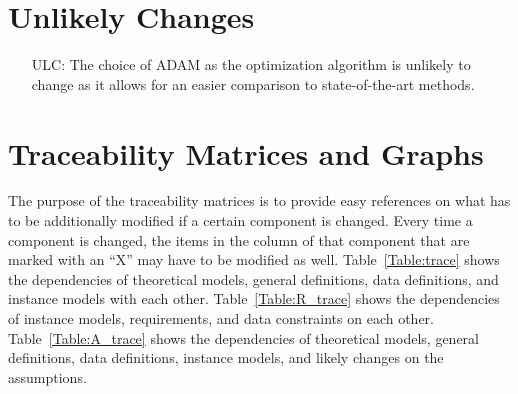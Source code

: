 \documentclass[12pt]{article}
\newcounter{lcnum} %
\newcounter{ulcnum} %
\begin{document}
\section{Unlikely Changes}    

\noindent \begin{itemize}

\item[ULC\refstepcounter{ulcnum}\theulcnum\label{ULC:meaningfulLabel}:] The choice of ADAM as the optimization algorithm is unlikely to change as it allows for an easier comparison to state-of-the-art methods.

\end{itemize}

\section{Traceability Matrices and Graphs}

The purpose of the traceability matrices is to provide easy references on what
has to be additionally modified if a certain component is changed.  Every time a
component is changed, the items in the column of that component that are marked
with an ``X'' may have to be modified as well.  Table~\ref{Table:trace} shows the
dependencies of theoretical models, general definitions, data definitions, and
instance models with each other. Table~\ref{Table:R_trace} shows the
dependencies of instance models, requirements, and data constraints on each
other. Table~\ref{Table:A_trace} shows the dependencies of theoretical models,
general definitions, data definitions, instance models, and likely changes on
the assumptions.
\end{document}
